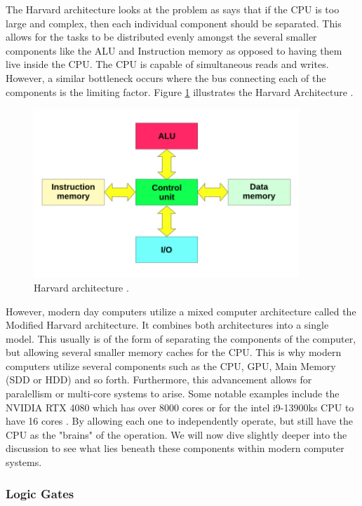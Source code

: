 The Harvard architecture looks at the problem as says that if the CPU is too large and complex, then each individual component should be separated.
This allows for the tasks to be distributed evenly amongst the several smaller components like the ALU and Instruction memory as opposed to having them live inside the CPU.
The CPU is capable of simultaneous reads and writes.
However, a similar bottleneck occurs where the bus connecting each of the components is the limiting factor.
Figure \ref{fig:HarvardArch} illustrates the Harvard Architecture \cite{HarvardArchImg}.

\begin{figure}[htb]
    \centering
    \includegraphics[width=10cm]{Images/Harvard_architecture.svg.png}
       \caption{Harvard architecture \cite{HarvardArchImg}.}
           \label{fig:HarvardArch}
\end{figure}

However, modern day computers utilize a mixed computer architecture called the Modified Harvard architecture.
It combines both architectures into a single model.
This usually is of the form of separating the components of the computer, but allowing several smaller memory caches for the CPU.
This is why modern computers utilize several components such as the CPU, GPU, Main Memory (SDD or HDD) and so forth.
Furthermore, this advancement allows for paralellism or multi-core systems to arise.
Some notable examples include the NVIDIA RTX 4080 which has over 8000 cores or for the intel i9-13900ks CPU to have 16 cores \cite{4080Specs,IntelSpecs}.
By allowing each one to independently operate, but still have the CPU as the "brains" of the operation.
We will now dive slightly deeper into the discussion to see what lies beneath these components within modern computer systems.

\subsubsection{Logic Gates}\label{subsec:LogicGates}

